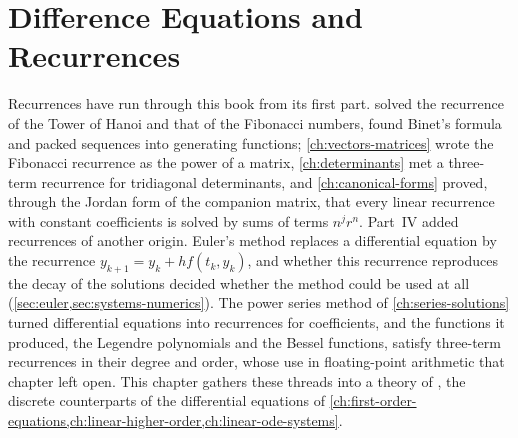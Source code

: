 \chapter{Difference Equations and Recurrences}
\label{ch:difference-equations}


Recurrences have run through this book from its first part.  solved the recurrence of the Tower of Hanoi and that of the Fibonacci numbers, found Binet's formula and packed sequences into generating functions; \cref{ch:vectors-matrices} wrote the Fibonacci recurrence as the power of a matrix, \cref{ch:determinants} met a three-term recurrence for tridiagonal determinants, and \cref{ch:canonical-forms} proved, through the Jordan form of the companion matrix, that every linear recurrence with constant coefficients is solved by sums of terms $n^jr^n$. Part~IV added recurrences of another origin. Euler's method replaces a differential equation by the recurrence $y_{k+1}=y_k+hf(t_k,y_k)$, and whether this recurrence reproduces the decay of the solutions decided whether the method could be used at all (\cref{sec:euler,sec:systems-numerics}). The power series method of \cref{ch:series-solutions} turned differential equations into recurrences for coefficients, and the functions it produced, the Legendre polynomials and the Bessel functions, satisfy three-term recurrences in their degree and order, whose use in floating-point arithmetic that chapter left open. This chapter gathers these threads into a theory of , the discrete counterparts of the differential equations of \cref{ch:first-order-equations,ch:linear-higher-order,ch:linear-ode-systems}.

